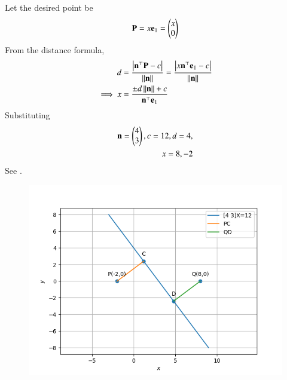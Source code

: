 Let the desired point be
\begin{align}
	\mathbf{P} = x\mathbf{e}_{1} = \begin{pmatrix}x\\0\end{pmatrix}
\end{align}
From the distance formula, 
\begin{align}
	d &= \frac{\left\vert\mathbf{n}^\top\mathbf{P}-c\right\vert}{\left\lVert\mathbf{n}\right\rVert}
	  = \frac{\left\vert x\mathbf{n}^\top\mathbf{e}_{1}-c\right\vert}{\left\lVert\mathbf{n}\right\rVert}
	  \\
	  \implies 
		x &= \frac{\pm d\left\lVert\mathbf{n}\right\rVert+c}{\mathbf{n}^\top\mathbf{e}_{1}}
\end{align}
Substituting
\begin{align}
		\mathbf{n} = \begin{pmatrix}4\\3\end{pmatrix} , c = 12,
	d = 4,
	\\
	x = 8,
	 -2
\end{align}
See .	
\begin{figure}[!h]
	\begin{center} 
	    \includegraphics[width=\columnwidth]{chapters/11/10/3/5/figs/line2}
	\end{center}
\caption{}
\label{fig:11/10/3/5/Fig1}
\end{figure}


